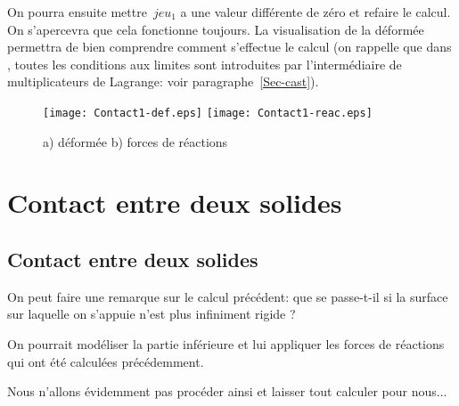 \medskip
On pourra ensuite mettre~$jeu_1$ a une valeur différente de zéro et refaire le calcul.
On s'apercevra que cela fonctionne toujours. La visualisation de la déformée permettra
de bien comprendre comment s'effectue le calcul (on rappelle que dans \castem, toutes 
les conditions aux limites sont introduites par l'intermédiaire de multiplicateurs de
Lagrange: voir paragraphe~\ref{Sec-cast}).

\begin{figure}[ht]
  \texttt{[image: Contact1-def.eps]} \hfill 
  \texttt{[image: Contact1-reac.eps]}
  \caption{\label{Fig-Cont1} a) déformée b) %
forces de réactions}
\end{figure}













\medskip
\ifVersionAvecExemplesSepares
  \section{Contact entre deux solides}
\else
  \subsection{Contact entre deux solides}
\fi

On peut faire une remarque sur le calcul précédent: que se passe-t-il si la surface sur laquelle
on s'appuie n'est plus infiniment rigide ?

\medskip
On pourrait modéliser la partie inférieure et lui appliquer les forces de réactions qui ont été
calculées précédemment.

Nous n'allons évidemment pas procéder ainsi et laisser \castem tout calculer pour nous...

